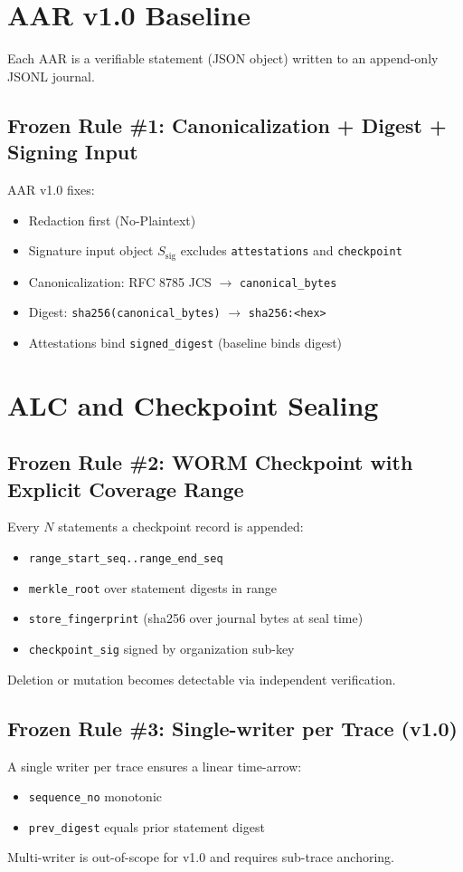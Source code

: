 \documentclass[11pt]{article}
\begin{document}
\section{AAR v1.0 Baseline}
Each AAR is a verifiable statement (JSON object) written to an append-only JSONL journal.

\subsection{Frozen Rule \#1: Canonicalization + Digest + Signing Input}
AAR v1.0 fixes:
\begin{itemize}
  \item Redaction first (No-Plaintext)
  \item Signature input object $S_{\text{sig}}$ excludes \texttt{attestations} and \texttt{checkpoint}
  \item Canonicalization: RFC 8785 JCS $\rightarrow$ \texttt{canonical\_bytes}
  \item Digest: \texttt{sha256(canonical\_bytes)} $\rightarrow$ \texttt{sha256:<hex>}
  \item Attestations bind \texttt{signed\_digest} (baseline binds digest)
\end{itemize}

\section{ALC and Checkpoint Sealing}
\subsection{Frozen Rule \#2: WORM Checkpoint with Explicit Coverage Range}
Every $N$ statements a checkpoint record is appended:
\begin{itemize}
  \item \texttt{range\_start\_seq..range\_end\_seq}
  \item \texttt{merkle\_root} over statement digests in range
  \item \texttt{store\_fingerprint} (sha256 over journal bytes at seal time)
  \item \texttt{checkpoint\_sig} signed by organization sub-key
\end{itemize}
Deletion or mutation becomes detectable via independent verification.

\subsection{Frozen Rule \#3: Single-writer per Trace (v1.0)}
A single writer per trace ensures a linear time-arrow:
\begin{itemize}
  \item \texttt{sequence\_no} monotonic
  \item \texttt{prev\_digest} equals prior statement digest
\end{itemize}
Multi-writer is out-of-scope for v1.0 and requires sub-trace anchoring.
\end{document}
